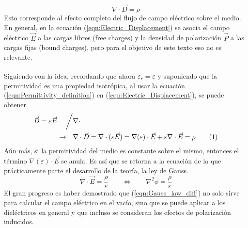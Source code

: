 \documentclass[12pt, twoside, onehalfspace, numbers, spanish]{ezthesis}
\newcommand\numberthis{\addtocounter{equation}{1}\tag{\theequation}}
\numberwithin{equation}{section}
\begin{document}
\begin{equation}
\nabla\cdot\vec{D} = \rho
\end{equation}
\noindent
Esto corresponde al efecto completo del flujo de campo eléctrico sobre el medio. En general, en la ecuación (\ref{eqn:Electric_Displacement}) se asocia el campo eléctrico $\vec{E}$ a las cargas libres (free charges) y la densidad de polarización $\vec{P}$ a las cargas fijas (bound charges), pero para el objetivo de este texto eso no es relevante.\\\\
Siguiendo con la idea, recordando que ahora $\varepsilon_r = \varepsilon$ y suponiendo que la permitividad es una propiedad isotrópica, al usar la ecuación (\ref{eqn:Permittivity_definition}) en (\ref{eqn:Electric_Displacement}), se puede obtener
\begin{align*}
\vec{D} = \varepsilon\vec{E}\quad\biggm/&\nabla\cdot\\
\rightarrow\quad&\nabla\cdot\vec{D}=\nabla\cdot(\varepsilon\vec{E}) = \nabla(\varepsilon)\cdot\vec{E} + \varepsilon\nabla\cdot\vec{E} = \rho \numberthis
\end{align*}
Aún más, si la permitividad del medio es constante sobre el mismo, entonces el término $\nabla (\varepsilon)\cdot\vec{E}$ se anula. Es así que se retorna a la ecuación de la que prácticamente parte el desarrollo de la teoría, la ley de Gauss.
\begin{equation}
\nabla\cdot\vec{E} = \frac{\rho}{\varepsilon} \qquad \iff \qquad \nabla^2\phi = \frac{\rho}{\varepsilon} \label{eqn:Laplace_potential}
\end{equation}
El gran progreso es haber demostrado que (\ref{eqn:Gauss_law_diff}) no solo sirve para calcular el campo eléctrico en el vacío, sino que se puede aplicar a los dieléctricos en general y que incluso se consideran los efectos de polarización inducidos.
\end{document}
